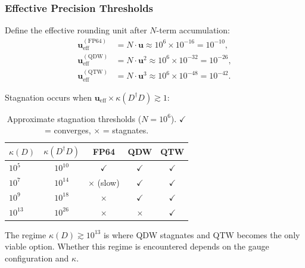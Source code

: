 \documentclass[12pt,a4paper]{article}
\newcommand{\uu}{\mathbf{u}}
\begin{document}
\subsubsection{Effective Precision Thresholds}

Define the effective rounding unit after $N$-term accumulation:
\begin{align}
  \uu_{\mathrm{eff}}^{(\mathrm{FP64})} &= N \cdot \uu \approx 10^6 \times 10^{-16} = 10^{-10}, \\
  \uu_{\mathrm{eff}}^{(\mathrm{QDW})}  &= N \cdot \uu^2 \approx 10^6 \times 10^{-32} = 10^{-26}, \\
  \uu_{\mathrm{eff}}^{(\mathrm{QTW})}  &= N \cdot \uu^3 \approx 10^6 \times 10^{-48} = 10^{-42}.
\end{align}

Stagnation occurs when $\uu_{\mathrm{eff}} \times \kappa(D^\dagger D) \gtrsim 1$:

\begin{table}[H]
\centering
\caption{Approximate stagnation thresholds ($N = 10^6$).
         $\checkmark$ = converges, $\times$ = stagnates.}
\begin{tabular}{lcccc}
\toprule
$\kappa(D)$ & $\kappa(D^\dagger D)$ & FP64 & QDW & QTW \\
\midrule
$10^5$    & $10^{10}$ & $\checkmark$ & $\checkmark$ & $\checkmark$ \\
$10^7$    & $10^{14}$ & $\times$ (slow) & $\checkmark$ & $\checkmark$ \\
$10^9$    & $10^{18}$ & $\times$        & $\checkmark$ & $\checkmark$ \\
$10^{13}$ & $10^{26}$ & $\times$        & $\times$     & $\checkmark$ \\
\bottomrule
\end{tabular}
\end{table}

The regime $\kappa(D) \gtrsim 10^{13}$ is where QDW stagnates and QTW becomes
the only viable option.
Whether this regime is encountered depends on the gauge configuration and $\kappa$.
\end{document}
